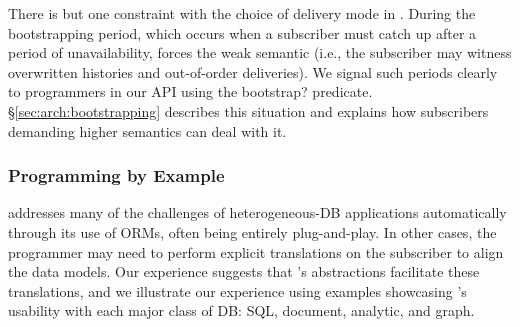 There is but one constraint with the choice of delivery mode in
\synapse.  During the bootstrapping period, which occurs when a
subscriber must catch up after a period of unavailability, \synapse
forces the weak semantic (i.e., the subscriber may witness overwritten
histories and out-of-order deliveries).  We signal such periods
clearly to programmers in our API using the {\code bootstrap?}
predicate.  \S\ref{sec:arch:bootstrapping} describes this situation and
explains how subscribers demanding higher semantics can deal with it. 
\subsubsection{\synapse Programming by Example}
\label{sec:examples}

\synapse addresses many of the challenges of heterogeneous-DB applications automatically through its use of ORMs, often being entirely plug-and-play.
In other cases, the programmer may need to perform explicit translations on the subscriber to align the data models.
Our experience suggests that \synapse's abstractions facilitate these translations, and we illustrate our experience using examples showcasing \synapse's usability with each major class of DB: SQL, document, analytic, and graph.

